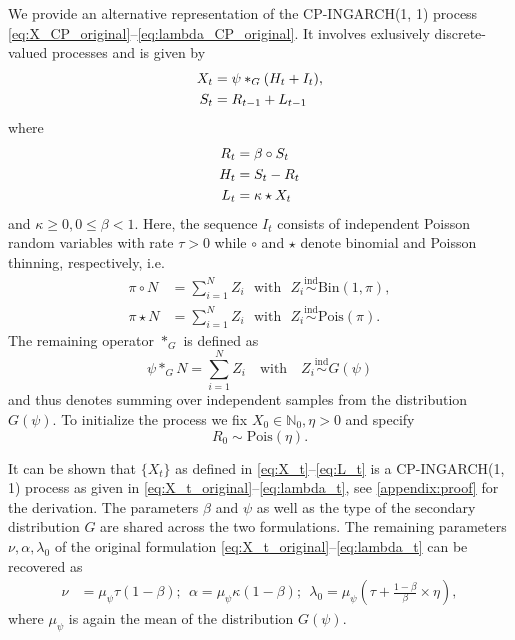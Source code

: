 \documentclass[review]{elsarticle}
\begin{document}
We provide an alternative representation of the CP-INGARCH(1, 1) process \eqref{eq:X_CP_original}--\eqref{eq:lambda_CP_original}. It involves exlusively discrete-valued processes and is given by
\begin{align}
X_t & = \psi *_G (H_t + I_t),\label{eq:X_t}\\
S_t & = R_{t - 1} + L_{t - 1}\label{eq:juv_t}
\end{align}
where
\begin{align}
R_t & = \beta \circ S_{t}\label{eq:R_t}\\
H_t & = S_t - R_t\\
L_t & = \kappa \star X_t \label{eq:L_t}
\end{align}
and $\kappa \geq 0, 0 \leq \beta <1$. Here, the sequence $I_t$ consists of independent Poisson random variables with rate $\tau > 0$ while $\circ$ and $\star$ denote binomial and Poisson thinning, respectively, i.e.\
\begin{align*}
\pi \circ N & = \sum_{i = 1}^N Z_i \ \ \ \text{with} \ \ \ Z_i \stackrel{\text{ind}}{\sim} \text{Bin}(1, \pi), \\
\pi \star N & = \sum_{i = 1}^N Z_i \ \ \ \text{with} \ \ \ Z_i \stackrel{\text{ind}}{\sim} \text{Pois}(\pi).
\end{align*}
The remaining operator $*_G$ is defined as
$$
\psi *_G N = \sum_{i = 1}^N Z_i \ \ \ \text{ with } \ \ \ Z_i \stackrel{\text{ind}}{\sim} G(\psi)
$$
and thus denotes summing over independent samples from the distribution $G(\psi)$. To initialize the process we fix $X_0 \in \mathbb{N}_0, \eta > 0$ and specify
$$
R_0 \sim \text{Pois}\left(\eta \right).
$$

It can be shown that $\{X_t\}$ as defined in \eqref{eq:X_t}--\eqref{eq:L_t} is a CP-INGARCH(1, 1) process as given in \eqref{eq:X_t_original}--\eqref{eq:lambda_t}, see \ref{appendix:proof} for the derivation. The parameters $\beta$ and $\psi$ as well as the type of the secondary distribution $G$ are shared across the two formulations. The remaining parameters $\nu, \alpha, \lambda_0$ of the original formulation \eqref{eq:X_t_original}--\eqref{eq:lambda_t} can be recovered as
\begin{align*}
\nu & = \mu_\psi \tau(1 - \beta); \ \
\alpha = \mu_\psi \kappa(1 - \beta); \ \
\lambda_0 = \mu_\psi \left(\tau + \frac{1 - \beta}{\beta} \times \eta\right),
\end{align*}
where $\mu_\psi$ is again the mean of the distribution $G(\psi)$. 
\end{document}
